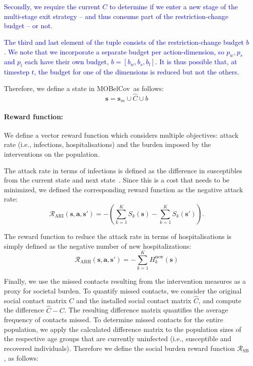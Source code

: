 \documentclass{article}
\renewcommand{\cite}[1]{\citep{#1}}
\newcommand\added[1]{\textcolor{blue}{#1}}
\newcommand{\mdprewardfn}{\mathcal{R}}
\newcommand{\mdpstate}{\mathbf{s}}
\newcommand{\mdpaction}{\mathbf{a}}
\newcommand{\momdpname}{MOBelCov}
\newcommand{\agegroups}{K}
\begin{document}
\added{Secondly, we require the current $\hat{C}$ to determine if we enter a new stage of the multi-stage exit strategy -- and thus consume part of the restriction-change budget -- or not.}

\added{The third and last element of the tuple consists of the restriction-change budget $b$. We note that we incorporate a separate budget per action-dimension, so $p_{w}, p_{s}$ and $p_{l}$ each have their own budget, $b = [b_w, b_s, b_l]$. It is thus possible that, at timestep $t$, the budget for one of the dimensions is reduced but not the others.}

Therefore, we define a state in \momdpname\ as follows:
\begin{equation}
    \mdpstate = \mdpstate_m \cup \hat{C} \cup b
\end{equation}

\paragraph{Reward function:} We define a vector reward function which considers multiple objectives: attack rate (i.e., infections, hospitalisations) and the burden imposed by the interventions on the population.

The attack rate in terms of infections is defined as the difference in susceptibles from the current state and next state~\cite{libin2020}. Since this is a cost that needs to be minimized, we defined the corresponding reward function as the negative attack rate:
\begin{equation}
\mdprewardfn_{\text{ARI}}(\mdpstate,\mdpaction,\mdpstate') = -(\sum_{k=1}^{\agegroups}S_k(\mdpstate)-\sum_{k=1}^{\agegroups}S_k(\mdpstate')).
\end{equation}

The reward function to reduce the attack rate in terms of hospitalisations is simply defined as the negative number of new hospitalizations:
\begin{equation}
\mdprewardfn_{\text{ARH}}(\mdpstate,\mdpaction,\mdpstate') = -\sum_{k=1}^{\agegroups}H^\text{new}_k(\mdpstate)
\label{eqn:attack-rate-hosp}
\end{equation}

Finally, we use the missed contacts resulting from the intervention measures as a proxy for societal burden. To quantify missed contacts, we consider the original social contact matrix $C$ and the installed social contact matrix $\hat{C}$, and compute the difference $\hat{C} - C$. 
The resulting difference matrix quantifies the average frequency of contacts missed. To determine missed contacts for the entire population, we apply the calculated difference matrix to the population sizes of the respective age groups that are currently uninfected (i.e., susceptible and recovered individuals). Therefore we define the social burden reward function $\mdprewardfn_{\text{SB}}$, as follows:
\end{document}
